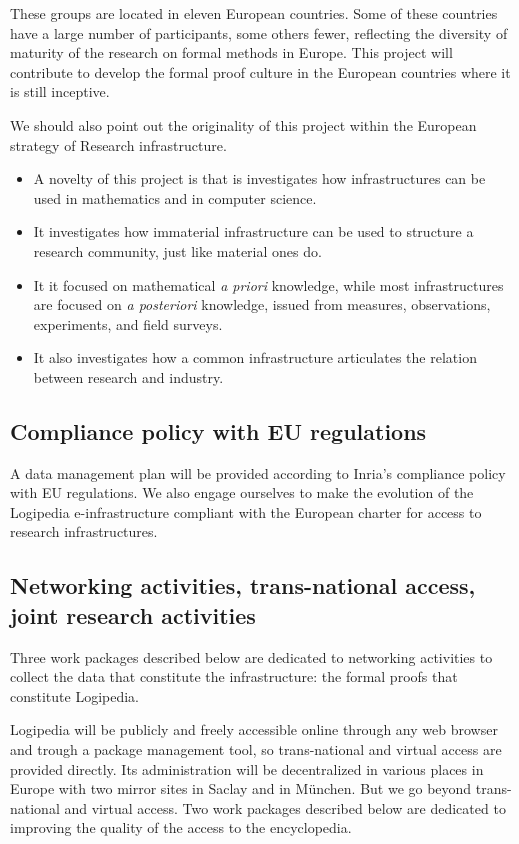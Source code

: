These groups are located in eleven European countries.  Some of these
countries have a large number of participants, some others fewer,
reflecting the diversity of maturity of the research on formal methods
in Europe. This project will contribute to develop the formal proof
culture in the European countries where it is still inceptive.

We should also point out the originality of this project within the
European strategy of Research infrastructure.
\begin{itemize}
\item A novelty of this
project is that is investigates how infrastructures can be used in
mathematics and in computer science.
\item It investigates how immaterial
infrastructure can be used to structure a research community, just
like material ones do.
\item It it focused on mathematical {\em a priori} knowledge, while
  most infrastructures are focused on {\em a posteriori} knowledge,
  issued from measures, observations, experiments, and field surveys.
\item It also investigates how a common infrastructure articulates the
  relation between research and industry.
\end{itemize}


\subsection{Compliance policy with EU regulations}

A data management plan will be provided according to Inria’s
compliance policy with EU regulations. We also engage ourselves to
make the evolution of the Logipedia e-infrastructure compliant
with the European charter for access to research infrastructures.

\subsection{Networking activities, trans-national access, joint
  research activities}

Three work packages described below are dedicated to networking activities
to collect the data that constitute the infrastructure: the formal proofs
that constitute Logipedia.

Logipedia will be publicly and freely accessible online through any
web browser and trough a package management tool, so trans-national
and virtual access are provided directly. Its administration will be
decentralized in various places in Europe with two mirror sites in
Saclay and in München. But we go beyond trans-national and virtual
access.  Two work packages described below are dedicated to improving
the quality of the access to the encyclopedia.

